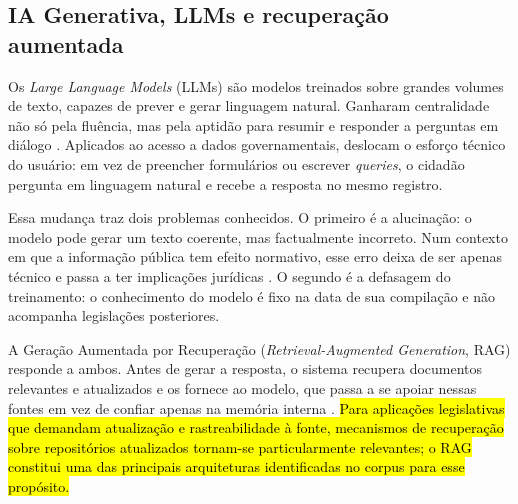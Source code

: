 \documentclass[brazilian]{sbc2025}
\newif\ifhl \hltrue
\newcommand{\rev}[1]{\ifhl\sethlcolor{yellow}\hl{#1}\else#1\fi}
\begin{document}
\subsection{IA Generativa, LLMs e recuperação aumentada}
\label{subsec:bg_genai}

Os \emph{Large Language Models} (LLMs) são modelos treinados sobre grandes volumes de texto, capazes de prever e gerar linguagem natural. Ganharam centralidade não só pela fluência, mas pela aptidão para resumir e responder a perguntas em diálogo \citep{JurafskyMartin2023}. Aplicados ao acesso a dados governamentais, deslocam o esforço técnico do usuário: em vez de preencher formulários ou escrever \emph{queries}, o cidadão pergunta em linguagem natural e recebe a resposta no mesmo registro.

Essa mudança traz dois problemas conhecidos. O primeiro é a alucinação: o modelo pode gerar um texto coerente, mas factualmente incorreto. Num contexto em que a informação pública tem efeito normativo, esse erro deixa de ser apenas técnico e passa a ter implicações jurídicas \citep{MarquesLaipelt2023}. O segundo é a defasagem do treinamento: o conhecimento do modelo é fixo na data de sua compilação e não acompanha legislações posteriores.

A Geração Aumentada por Recuperação (\emph{Retrieval-Augmented Generation}, RAG) responde a ambos. Antes de gerar a resposta, o sistema recupera documentos relevantes e atualizados e os fornece ao modelo, que passa a se apoiar nessas fontes em vez de confiar apenas na memória interna \citep{Lewis2020}. \rev{Para aplicações legislativas que demandam atualização e rastreabilidade à fonte, mecanismos de recuperação sobre repositórios atualizados tornam-se particularmente relevantes; o RAG constitui uma das principais arquiteturas identificadas no corpus para esse propósito.}
\end{document}

